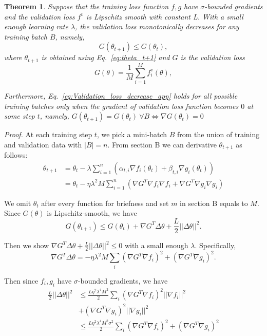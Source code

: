 \documentclass{article}
\newtheorem*{theorem*}{Theorem}
\begin{document}
\begin{theorem*}
Suppose that the training loss function $f,g$ have $\sigma$-bounded gradients and the validation loss $f^v$ is Lipschitz smooth with constant L. With a small enough learning rate $\lambda$, the validation loss monotonically decreases for any training batch $B$, namely, 
\begin{equation}\label{eq:Validation_loss_decrease_app}
G(\theta_{t+1})\leq G(\theta_t),
\end{equation}
where $\theta_{t+1}$ is obtained using Eq.~\eqref{eq:theta_t+1} and $G$ is the validation loss
\begin{equation}\label{eq:Validation_loss_app}
G(\theta)=\frac{1}{M}\sum_{i=1}^M f_i^v(\theta),
\end{equation}

Furthermore, Eq.~\eqref{eq:Validation_loss_decrease_app} holds for all possible training batches only when the gradient of validation loss function becomes $0$ at some step $t$, namely, $G(\theta_{t+1})=G(\theta_t)\ \forall B \Leftrightarrow \nabla G(\theta_t)=0$
\end{theorem*}

\textit{Proof.} At each training step $t$, we pick a mini-batch $B$ from the union of training and validation data with $|B|=n$. From section B we can derivative $\theta_{t+1}$ as follows: 
\begin{align}
\theta_{t+1}&=\theta_t-\lambda\sum_{i=1}^n(\alpha_{t,i}\nabla f_i(\theta_t)+\beta_{t,i}\nabla g_i(\theta_t)) \\
&=\theta_t-\eta\lambda^2M\sum_{i=1}^n(\nabla G^T\nabla f_i \nabla f_i+\nabla G^T\nabla g_i \nabla g_i)
\end{align}

We omit $\theta_t$ after every function for briefness and set $m$ in section B equals to $M$. Since $G(\theta)$ is Lipschitz-smooth, we have 
\begin{equation}
    G(\theta_{t+1})\leq G(\theta_t)+\nabla G^T \Delta \theta+\frac{L}{2}||\Delta \theta||^2.
\end{equation}


Then we show $\nabla G^T \Delta \theta+\frac{L}{2}||\Delta \theta||^2\leq 0$ with a small enough $\lambda$. Specifically, \begin{equation}
\nabla G^T \Delta \theta = -\eta\lambda^2M\sum_i(\nabla G^T \nabla f_i)^2+(\nabla G^T \nabla g_i)^2.
\end{equation}

Then since $f_i,g_i$ have $\sigma$-bounded gradients, we have 
\begin{align}
\frac{L}{2}||\Delta \theta||^2&\leq \frac{L\eta^2\lambda^4M^2}{2}\sum_i (\nabla G^T \nabla f_i)^2||\nabla f_i||^2 \\
&+(\nabla G^T \nabla g_i)^2||\nabla g_i||^2\\
&\leq \frac{L\eta^2\lambda^4M^2\sigma^2}{2}\sum_i (\nabla G^T \nabla f_i)^2 +(\nabla G^T \nabla g_i)^2
\end{align}
\end{document}
